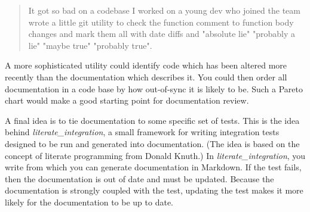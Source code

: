 \documentclass[landscape]{sciposter}
\begin{document}
\begin{multicols}{4}
        \begin{quote}
            It got so bad on a codebase I worked on a young dev who joined
            the team wrote a little git utility to check the function comment
            to function body changes and mark them all with date diffs and
            "absolute lie" "probably a lie" "maybe true" "probably true".
        \end{quote}

        A more sophisticated utility could identify code which has been
        altered more recently than the documentation which describes it.
        You could then order all documentation in a code base by how out-of-sync
        it is likely to be.  Such a Pareto chart would make a good starting
        point for documentation review.

        A final idea is to tie documentation to some specific set of tests.
        This is the idea behind \textit{literate\_integration}, a small framework
        for writing integration tests designed to be run and generated
        into documentation. (The idea is based on the concept of literate
        programming from Donald Knuth.)  In \textit{literate\_integration}, you
        write from which you can generate documentation in Markdown.  If
        the test fails, then the documentation is out of date and must
        be updated.  Because the documentation is strongly coupled with
        the test, updating the test makes it more likely for the documentation
        to be up to date.

\end{multicols}
\end{document}
